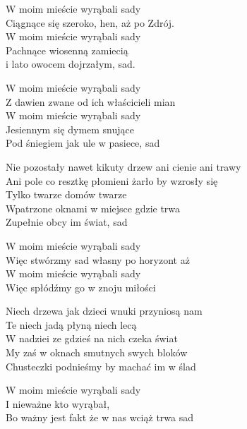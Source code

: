 \begin{text}
    \ifchorded{\hfill\break}
    W moim mieście wyrąbali sady\\
    Ciągnące się szeroko, hen, aż po Zdrój.\\
    W moim mieście wyrąbali sady\\
    Pachnące wiosenną zamiecią\\
    i lato owocem dojrzałym, sad.

    W moim mieście wyrąbali sady\\
    Z dawien zwane od ich właścicieli mian\\
    W moim mieście wyrąbali sady\\
    Jesiennym się dymem snujące\\
    Pod śniegiem jak ule w pasiece, sad

    Nie pozostały nawet kikuty drzew ani cienie ani trawy\\
    Ani pole co resztkę płomieni żarło by wzrosły się\\
    Tylko twarze domów twarze\\
    Wpatrzone oknami w miejsce gdzie trwa\\
    Zupełnie obcy im świat, sad

    W moim mieście wyrąbali sady\\
    Więc stwórzmy sad własny po horyzont aż\\
    W moim mieście wyrąbali sady\\
    Więc spłódźmy go w znoju miłości

    Niech drzewa jak dzieci wnuki przyniosą nam\\
    Te niech jadą płyną niech lecą\\
    W nadziei ze gdzieś na nich czeka świat\\
    My zaś w oknach smutnych swych bloków\\
    Chusteczki podnieśmy by machać im w ślad

    W moim mieście wyrąbali sady\\
    I nieważne kto wyrąbał,\\
    Bo ważny jest fakt że w nas wciąż trwa sad
\end{text}

